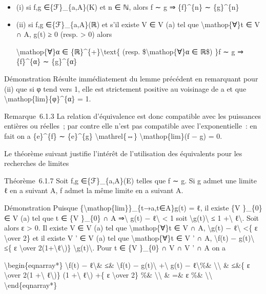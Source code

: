 \documentclass[]{article}
\begin{document}
\begin{itemize}
\item
  (i) si f,g ∈\{ℱ\}\_\{a,A\}(K) et n ∈ ℕ, alors f ∼ g ⇒ \{f\}\^{}\{n\} ∼
  \{g\}\^{}\{n\}
\item
  (ii) si f,g ∈\{ℱ\}\_\{a,A\}(ℝ) et s'il existe V ∈ V (a) tel que
  \textbackslash{}mathop\{∀\}t ∈ V ∩ A, g(t) ≥ 0 (resp. \textgreater{}
  0) alors

  \textbackslash{}mathop\{∀\}α ∈ \{ℝ\}\^{}\{+\}\textbackslash{}text\{
  (resp. \$\textbackslash{}mathop\{∀\}α ∈ ℝ\$) \}f ∼ g ⇒ \{f\}\^{}\{α\}
  ∼ \{g\}\^{}\{α\}
\end{itemize}

Démonstration Résulte immédiatement du lemme précédent en remarquant
pour (ii) que si φ tend vers 1, elle est strictement positive au
voisinage de a et que \textbackslash{}mathop\{lim\}\{φ\}\^{}\{α\} = 1.

Remarque~6.1.3 La relation d'équivalence est donc compatible avec les
puissances entières ou réelles~; par contre elle n'est pas compatible
avec l'exponentielle~: en fait on a \{e\}\^{}\{f\} ∼ \{e\}\^{}\{g\}
\textbackslash{}mathrel\{⇔\} \textbackslash{}mathop\{lim\}(f − g) = 0.

Le théorème suivant justifie l'intérêt de l'utilisation des équivalents
pour les recherches de limites

Théorème~6.1.7 Soit f,g ∈\{ℱ\}\_\{a,A\}(E) telles que f ∼ g. Si g admet
une limite ℓ en a suivant A, f admet la même limite en a suivant A.

Démonstration Puisque \{\textbackslash{}mathop\{lim\}\}\_\{t→a,t∈A\}g(t)
= ℓ, il existe \{V \}\_\{0\} ∈ V (a) tel que t ∈ \{V \}\_\{0\} ∩ A
⇒\textbackslash{}\textbar{} g(t) − ℓ\textbackslash{}\textbar{}
\textless{} 1 soit
\textbackslash{}\textbar{}g(t)\textbackslash{}\textbar{} ≤ 1
+\textbackslash{}\textbar{} ℓ\textbackslash{}\textbar{}. Soit alors ε
\textgreater{} 0. Il existe V ∈ V (a) tel que
\textbackslash{}mathop\{∀\}t ∈ V ∩ A, \textbackslash{}\textbar{}g(t) −
ℓ\textbackslash{}\textbar{} \textless{}\{ ε \textbackslash{}over 2\} et
il existe V ' ∈ V (a) tel que \textbackslash{}mathop\{∀\}t ∈ V ' ∩ A,
\textbackslash{}\textbar{}f(t) − g(t)\textbackslash{}\textbar{} ≤\{ ε
\textbackslash{}over
2(1+\textbackslash{}\textbar{}ℓ\textbackslash{}\textbar{})\}
\textbackslash{}\textbar{}g(t)\textbackslash{}\textbar{}. Pour t ∈ \{V
\}\_\{0\} ∩ V ∩ V ' ∩ A on a

\textbackslash{}begin\{eqnarray*\} \textbackslash{}\textbar{}f(t) −
ℓ\textbackslash{}\textbar{}\& ≤\& \textbackslash{}\textbar{}f(t) −
g(t)\textbackslash{}\textbar{} +\textbackslash{}\textbar{} g(t) −
ℓ\textbackslash{}\textbar{}\%\& \textbackslash{}\textbackslash{} \&
≤\&\{ ε \textbackslash{}over 2(1 +\textbackslash{}\textbar{}
ℓ\textbackslash{}\textbar{})\} (1 +\textbackslash{}\textbar{}
ℓ\textbackslash{}\textbar{}) +\{ ε \textbackslash{}over 2\} \%\&
\textbackslash{}\textbackslash{} \& =\& ε \%\&
\textbackslash{}\textbackslash{} \textbackslash{}end\{eqnarray*\}
\end{document}
